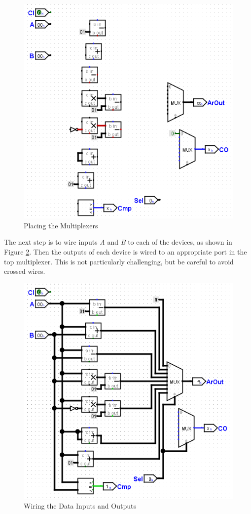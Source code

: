 \begin{figure}[H]
	\centering
	\includegraphics[width=\maxwidth{.95\linewidth}]{gfx/arith-03}
	\caption{Placing the Multiplexers}
	\label{fig:arith-03}
\end{figure}

The next step is to wire inputs \textit{A} and \textit{B} to each of the devices, as shown in Figure \ref{fig:arith-04}. Then the outputs of each device is wired to an appropriate port in the top multiplexer. This is not particularly challenging, but be careful to avoid crossed wires. 

\begin{figure}[H]
	\centering
	\includegraphics[width=\maxwidth{.95\linewidth}]{gfx/arith-04}
	\caption{Wiring the Data Inputs and Outputs}
	\label{fig:arith-04}
\end{figure}


